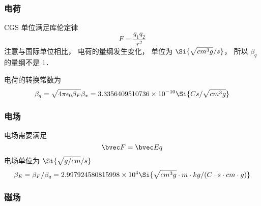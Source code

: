 
\begin{issues}
\issueDraft
\end{issues}


\subsubsection{电荷}
CGS 单位满足库伦定律
\begin{equation}
F = \frac{q_1 q_2}{r^2}
\end{equation}
注意与国际单位相比， 电荷的量纲发生变化， 单位为 $\Si{\sqrt{cm^3 g}/s}$， 所以 $\beta_q$ 的量纲不是 1．

电荷的转换常数为
\begin{equation}
\beta_q = \sqrt{4\pi\epsilon_0\beta_F} \beta_x = 3.3356409510736\times 10^{-10} \Si{Cs/\sqrt{cm^3 g}}
\end{equation}

\subsubsection{电场}
电场需要满足
\begin{equation}
\bvec F = \bvec E q
\end{equation}
电场单位为 $\Si{\sqrt{g/cm}/s}$
\begin{equation}
\beta_E = \beta_F/\beta_q = 2.997924580815998\times 10^4 \Si{\sqrt{cm^3 g}\cdot m\cdot kg/(C\cdot s\cdot cm\cdot g)}
\end{equation}

\subsubsection{磁场}

